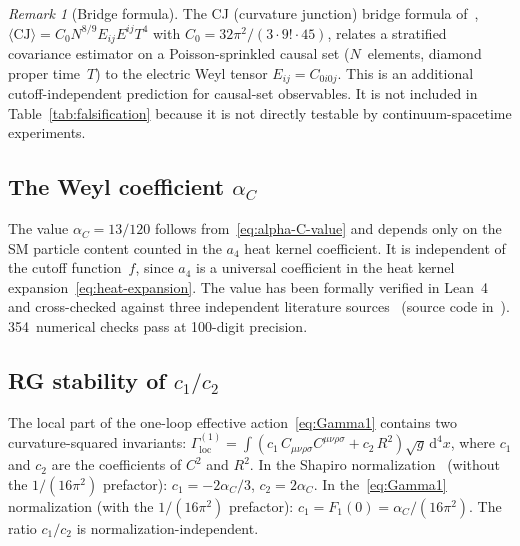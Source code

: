 \documentclass[12pt,a4paper]{article}
\theoremstyle{plain}
\theoremstyle{definition}
\theoremstyle{remark}
\newtheorem{remark}[theorem]{Remark}
\newcommand{\dd}{\mathrm{d}}
\newcommand{\Weylsq}{C_{\mu\nu\rho\sigma}C^{\mu\nu\rho\sigma}}
\begin{document}
\begin{remark}[Bridge formula]
The CJ (curvature junction) bridge formula
of~\cite{Alfyorov:2026paper7},
$\langle \mathrm{CJ} \rangle = C_0 N^{8/9} E_{ij}E^{ij} T^4$
with $C_0 = 32\pi^2/(3 \cdot 9! \cdot 45)$, relates a
stratified covariance estimator on a Poisson-sprinkled causal
set ($N$~elements, diamond proper time~$T$) to the electric
Weyl tensor $E_{ij} = C_{0i0j}$.  This is an additional
cutoff-independent prediction for causal-set observables.  It is
not included in Table~\ref{tab:falsification} because it is not
directly testable by continuum-spacetime experiments.
\end{remark}

\subsection{The Weyl coefficient $\alpha_C$}
\label{sec:alphaC}

The value $\alpha_C = 13/120$ follows
from~\eqref{eq:alpha-C-value} and depends only on the SM
particle content counted in the $a_4$ heat kernel coefficient.
It is independent of the cutoff function~$f$, since $a_4$ is
a universal coefficient in the heat kernel
expansion~\eqref{eq:heat-expansion}.  The value has been
formally verified in Lean~4 and cross-checked against three
independent literature
sources~\cite{CZ:2012,CPR:2008,ParkerToms:2009}
(source code in~\cite{Alfyorov:2026repo}).  354~numerical
checks pass at 100-digit precision.

\subsection{RG stability of $c_1/c_2$}
\label{sec:running}

The local part of the one-loop effective
action~\eqref{eq:Gamma1} contains two curvature-squared
invariants:
$\Gamma^{(1)}_{\mathrm{loc}} = \int (c_1\, \Weylsq + c_2\, R^2)
\sqrt{g}\,\dd^4 x$,
where $c_1$ and $c_2$ are the coefficients of $C^2$ and $R^2$.
In the Shapiro normalization~\cite{Shapiro:2004} (without the
$1/(16\pi^2)$ prefactor): $c_1 = -2\alpha_C/3$,
$c_2 = 2\alpha_C$.  In the~\eqref{eq:Gamma1} normalization
(with the $1/(16\pi^2)$ prefactor):
$c_1 = F_1(0) = \alpha_C/(16\pi^2)$.  The ratio $c_1/c_2$ is
normalization-independent.
\end{document}
